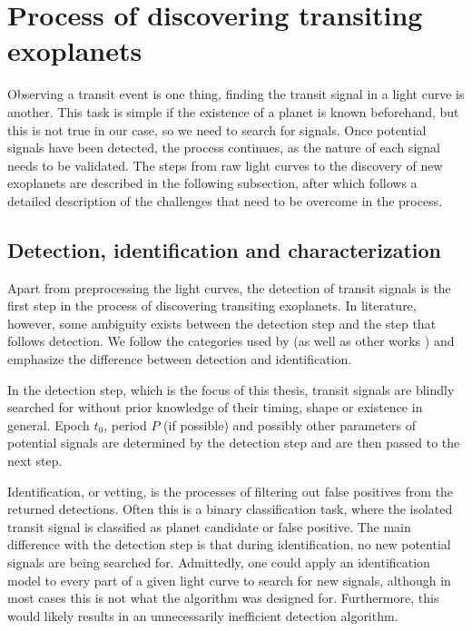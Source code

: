 
\section{Process of discovering transiting exoplanets}
Observing a transit event is one thing, finding the transit signal in a light curve is another. This task is simple if the existence of a planet is known beforehand, but this is not true in our case, so we need to search for signals. Once potential signals have been detected, the process continues, as the nature of each signal needs to be validated. The steps from raw light curves to the discovery of new exoplanets are described in the following subsection, after which follows a detailed description of the challenges that need to be overcome in the process.

\subsection{Detection, identification and characterization}
\label{sec:disc_process}

Apart from preprocessing the light curves, the detection of transit signals is the first step in the process of discovering transiting exoplanets. In literature, however, some ambiguity exists between the detection step and the step that follows detection. We follow the categories used by  \cite{jaratransiting} (as well as other works ) and emphasize the difference between detection and identification.

In the detection step, which is the focus of this thesis, transit signals are blindly searched for without prior knowledge of their timing, shape or existence in general. Epoch $t_0$, period $P$ (if possible) and possibly other parameters of potential signals are determined by the detection step and are then passed to the next step.

Identification, or vetting, is the processes of filtering out false positives from the returned detections. Often this is a binary classification task, where the isolated transit signal is classified as planet candidate or false positive. The main difference with the detection step is that during identification, no new potential signals are being searched for. Admittedly, one could apply an identification model to every part of a given light curve to search for new signals, although in most cases this is not what the algorithm was designed for. Furthermore, this would likely results in an unnecessarily inefficient detection algorithm.

